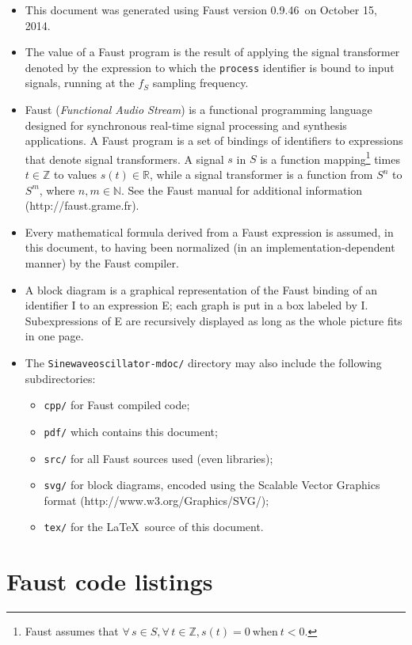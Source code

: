 \documentclass{article}
\newcommand{\faustdocdir}{Sinewaveoscillator-mdoc}
\newcommand{\faustversion}{0.9.46}
\newcommand{\faustdocdate}{October 15, 2014}
\begin{document}
\begin{itemize}
	\item This document was generated using Faust version \faustversion\ on \faustdocdate.
	\item The value of a Faust program is the result of applying the signal transformer denoted by the expression to which the \texttt{process} identifier is bound to input signals, running at the $f_S$ sampling frequency.
	\item Faust (\emph{Functional Audio Stream}) is a functional programming language designed for synchronous real-time signal processing and synthesis applications. A Faust program is a set of bindings of identifiers to expressions that denote signal transformers. A signal $s$ in $S$ is a function mapping\footnote{Faust assumes that $\forall \, s \in S, \forall \, t \in \mathbb{Z}, s(t) = 0 \mathrm{\ when\ } t < 0$.} times $t \in \mathbb{Z}$ to values $s(t) \in \mathbb{R}$, while a signal transformer is a function from $S^n$ to $S^m$, where $n,m\in \mathbb{N}$. See the Faust manual for additional information (\textsf{http://faust.grame.fr}).
	\item Every mathematical formula derived from a Faust expression is assumed, in this document, to having been normalized (in an implementation-depen\-dent manner) by the Faust compiler.
	\item A block diagram is a graphical representation of the Faust binding of an identifier I to an expression E; each graph is put in a box labeled by I. Subexpressions of E are recursively displayed as long as the whole picture fits in one page.
	\item The \texttt{\faustdocdir/} directory may also include the following subdirectories:
\begin{itemize}
	\item	\texttt{cpp/} for Faust compiled code; 
	\item	\texttt{pdf/} which contains this document; 
	\item	\texttt{src/} for all Faust sources used (even libraries); 
	\item	\texttt{svg/} for block diagrams, encoded using the Scalable Vector Graphics format (\textsf{http://www.w3.org/Graphics/SVG/});
	\item	\texttt{tex/} for the \LaTeX\ source of this document.
\end{itemize}
\end{itemize}


\section{Faust code listings}
\label{listing}
\end{document}
